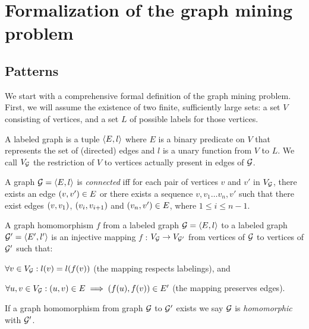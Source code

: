 \vspace{-1em}
\section{Formalization of the graph mining problem}\label{sec:formalization}
\subsection{Patterns}
We start with a comprehensive formal definition of the graph mining problem.
First, we will assume the existence of two finite, sufficiently large sets: a set $V$ consisting of vertices, and a set $L$ of possible labels for those vertices.

\begin{definition}
A labeled graph  is a tuple $\langle E,l \rangle$ where $E$ is a binary predicate on $V$ that represents the set of (directed) edges and $l$ is a unary function from $V$ to $L$. We call $V_{\mathcal{G}}$ the restriction of $V$ to vertices actually present in edges of $\mathcal{G}$.
\end{definition}
\vspace{-1.5em}
\begin{definition}
A graph $\mathcal{G} = \langle E,l \rangle$ is \emph{connected} iff for each pair of vertices $v$ and $v'$ in $V_{\mathcal{G}}$, there exists an edge $\left(v,v'\right) \in E$ or there exists a sequence $v, v_{1} \ldots v_{n}, v'$ such that there exist edges $\left(v,v_{1}\right)$, $\left(v_{i},v_{i+1}\right)$ and $\left(v_{n},v'\right) \in E$, where $1 \leq i \leq n-1$.
\end{definition}

\begin{definition}
A graph homomorphism $f$ from a labeled graph $\mathcal{G} = \langle E,l \rangle$ to a labeled graph $\mathcal{G}' = \langle E',l' \rangle$ is an injective mapping $f$ : $V_{\mathcal{G}} \rightarrow V_{\mathcal{G}'}$ from vertices of $\mathcal{G}$ to vertices of $\mathcal{G'}$ such that:
\begin{compactitem}
\item $\forall v \in V_{\mathcal{G}} : l(v) = l(f(v))$ (the mapping respects labelings), and
\item $\forall u,v \in V_{\mathcal{G}} : \left(u,v\right) \in E \implies \left(f(u),f(v)\right) \in E'$ (the mapping preserves edges).
\end{compactitem}
If a graph homomorphism from graph $\mathcal{G}$ to $\mathcal{G'}$ exists we say $\mathcal{G}$ is \emph{homomorphic} with $\mathcal{G'}$.
\end{definition}

